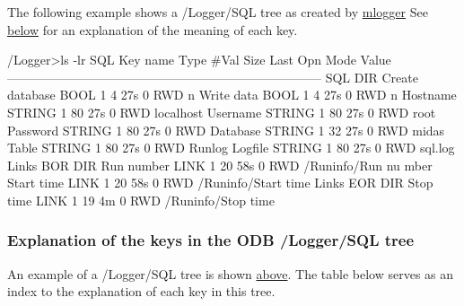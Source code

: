 \label{F_mySQL_F_Logger_SQL_tree}
\hypertarget{F_mySQL_F_Logger_SQL_tree}{}
 The following example shows a /Logger/SQL tree as created by \hyperlink{F_Logging_F_mlogger_utility}{mlogger} See \hyperlink{F_mySQL_F_Logger_SQL_keys}{below} for an explanation of the meaning of each key. 
\begin{DoxyCode}
/Logger>ls -lr SQL
Key name                        Type    #Val  Size  Last Opn Mode Value
---------------------------------------------------------------------------
SQL                         DIR
    Create database             BOOL    1     4     27s  0   RWD  n
    Write data                  BOOL    1     4     27s  0   RWD  n
    Hostname                    STRING  1     80    27s  0   RWD  localhost
    Username                    STRING  1     80    27s  0   RWD  root
    Password                    STRING  1     80    27s  0   RWD
    Database                    STRING  1     32    27s  0   RWD  midas
    Table                       STRING  1     80    27s  0   RWD  Runlog
    Logfile                     STRING  1     80    27s  0   RWD  sql.log
    Links BOR                   DIR
        Run number              LINK    1     20    58s  0   RWD  /Runinfo/Run nu
      mber
        Start time              LINK    1     20    58s  0   RWD  /Runinfo/Start 
      time
    Links EOR                   DIR
        Stop time               LINK    1     19    4m   0   RWD  /Runinfo/Stop 
      time
\end{DoxyCode}
\hypertarget{F_mySQL_F_Logger_SQL_keys}{}\subsubsection{Explanation of the keys in the ODB /Logger/SQL tree}\label{F_mySQL_F_Logger_SQL_keys}
An example of a /Logger/SQL tree is shown \hyperlink{F_mySQL_F_Logger_SQL_tree}{above}. The table below serves as an index to the explanation of each key in this tree.

